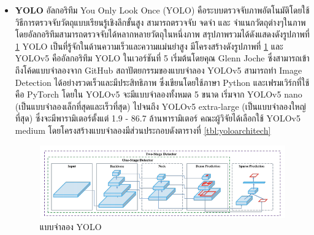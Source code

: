 \documentclass[12pt,oneside,openright,a4paper]{cpe-thai-project}
\begin{document}
\begin{itemize}
\pagebreak

\item\textbf{YOLO}
อัลกอริทึม You Only Look Once (YOLO) \cite{yolo} คือระบบตรวจจับภาพอัตโนมัติโดยใช้วิธีการตรวจจับวัตถุแบบเรียนรู้เชิงลึกขั้นสูง สามารถตรวจจับ จดจำ และ จำแนกวัตถุต่างๆในภาพ โดยอัลกอริทึมสามารถตรวจจับได้หลากหลายวัตถุในหนึ่งภาพ สรุปภาพรวมได้ดังแสดงดังรูปภาพที่ \ref{fig:yolo-arch} YOLO เป็นที่รู้จักในด้านความเร็วและความแม่นยำสูง มีโครงสร้างดังรูปภาพที่ \ref{fig:yolo-arch} และ YOLOv5 คืออัลกอริทึม YOLO ในเวอร์ชันที่ 5 เริ่มต้นโดยคุณ Glenn Joche ซึ่งสามารถเข้าถึงโค้ดแบบจำลองจาก GitHub \cite{yolo-repo}  สถาปัตยกรรมของแบบจำลอง YOLOv5 สามารถทำ Image Detection ได้อย่างรวดเร็วและมีประสิทธิภาพ ซึ่งเขียนโดยใช้ภาษา Python และเฟรมเวิร์กที่ใช้คือ PyTorch โดยใน YOLOv5 จะมีแบบจำลองทั้งหมด 5 ขนาด เริ่มจาก YOLOv5 nano (เป็นแบบจำลองเล็กที่สุดและเร็วที่สุด) ไปจนถึง YOLOv5 extra-large (เป็นแบบจำลองใหญ่ที่สุด) ซึ่งจะมีพารามิเตอร์ตั้งแต่ 1.9 - 86.7 ล้านพารามิเตอร์\cite{rath_2022} คณะผู้วิจัยได้เลือกใช้ YOLOv5 medium โดยโครงสร้างแบบจำลองมีส่วนประกอบดังตารางที่ \ref{tbl:yoloarchitech} \\
\begin{figure}[!h]
    \centering
    \includegraphics[scale=0.4]{images/yolo-arch.png}
    \caption[แบบจำลอง YOLO]{แบบจำลอง YOLO \cite{img_yolo}}
    \label{fig:yolo-arch}
\end{figure}
\end{itemize}
\end{document}
